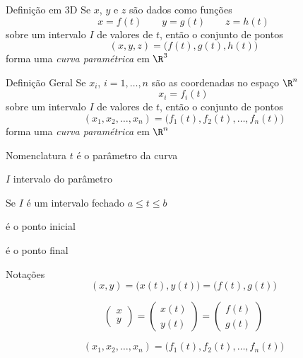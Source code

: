 \begin{frame}{Definição em 3D}
  Se $x$, $y$ e $z$ são dados como funções
  \[
    x = f(t)
    \qquad
    y = g(t)
    \qquad
    z = h(t)
  \]
  sobre um intervalo $I$ de valores de $t$,
  então o conjunto de pontos
  \[
    (x, y, z) = \big( f(t), g(t), h(t) \big)
  \]
  forma uma \emph{curva paramétrica} em $\R^3$
\end{frame}

\begin{frame}{Definição Geral}
  Se $x_i$, $i=1, \dots, n$ são as coordenadas no espaço $\R^n$
  \[
    x_i = f_i(t)
  \]
  sobre um intervalo $I$ de valores de $t$,
  então o conjunto de pontos
  \[
    (x_1, x_2, \dots, x_n) = \big( f_1(t), f_2(t), \dots, f_n(t)\big)
  \]
  forma uma \emph{curva paramétrica} em $\R^n$
\end{frame}

\begin{frame}{Nomenclatura}
  \emph{$t$} \quad é o parâmetro da curva

  \pause
  \emph{$I$} \quad intervalo do parâmetro

  \pause
  \vspace{\baselineskip}
  Se $I$ é um intervalo fechado \emph{\(a\leq t \leq b\)}
  \pause
  \begin{description}[<+->]
    \item[\(\big(f(a), g(a)\big)\)] é o ponto inicial
    \item[\(\big(f(b), g(b)\big)\)] é o ponto final
  \end{description}
\end{frame}

\begin{frame}{Notações}
  \[
    (x, y)
    = \big(x(t), y(t)\big)
    = \big(f(t), g(t)\big)
  \]

  \pause
  \[
      \begin{pmatrix}  x    \\ y    \end{pmatrix}
    = \begin{pmatrix}  x(t) \\ y(t) \end{pmatrix}
    = \begin{pmatrix}  f(t) \\ g(t) \end{pmatrix}
  \]

  \pause
  \[
    (x_1, x_2, \dots, x_n) = \big( f_1(t), f_2(t), \dots, f_n(t)\big)
  \]
\end{frame}


